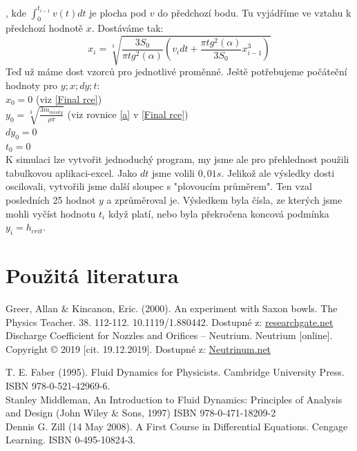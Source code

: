 \documentclass[14pt,a4paper]{article}
\begin{document}
, kde $\int_{0}^{t_{i-1}} v(t)dt$ je plocha pod $v$ do předchozí bodu. Tu vyjádříme ve vztahu k předchozí hodnotě $x$. Dostáváme tak:
\begin{equation}
x_i=\sqrt[3]{\frac{3S_0}{\pi tg^2(\alpha)} \left(v_idt+\frac{\pi tg^2(\alpha)}{3S_0}x_{i-1}^{3}\right)}
\end{equation}
Teď už máme dost vzorců pro jednotlivé proměnné.
Ještě potřebujeme počáteční hodnoty pro $y ; x; dy;t$:\\
$x_0=0$ (viz \ref{Final rce})\\
$y_0=\sqrt[3]{\frac{3m_{misky}}{\rho \pi}}$	(viz rovnice \ref{a} v \ref{Final rce})\\
$dy_0=0$\\
$t_0=0$\\
K simulaci lze vytvořit jednoduchý program, my jsme ale pro přehlednost použili tabulkovou aplikaci-excel. Jako $dt$ jsme volili $0,01s$. Jelikož ale výsledky dosti oscilovali, vytvořili jsme další sloupec s "plovoucím průměrem". Ten vzal posledních 25 hodnot $y$ a zprůměroval je. Výsledkem byla čísla, ze kterých jsme mohli vyčíst hodnotu $t_i$ když platí, nebo byla překročena koncová podmínka $y_i=h_{crit}$.
\newpage
\section{Použitá literatura}
\begin{thebibliography}{3}
Greer, Allan \& Kincanon, Eric. (2000). An experiment with Saxon bowls. The Physics Teacher. 38. 112-112. 10.1119/1.880442.  Dostupné z:
\href{https://www.researchgate.net/publication/239045627_An_experiment_with_Saxon_bowls}{ researchgate.net}
Discharge Coefficient for Nozzles and Orifices – Neutrium. Neutrium [online]. Copyright © 2019 [cit. 19.12.2019]. Dostupné z:
\href{https://neutrium.net/fluid_flow/discharge-coefficient-for-nozzles-and-orifices/}{Neutrinum.net}

T. E. Faber (1995). Fluid Dynamics for Physicists. Cambridge University Press. ISBN 978-0-521-42969-6.\\
Stanley Middleman, An Introduction to Fluid Dynamics: Principles of Analysis and Design (John Wiley \& Sons, 1997) ISBN 978-0-471-18209-2\\
Dennis G. Zill (14 May 2008). A First Course in Differential Equations. Cengage Learning. ISBN 0-495-10824-3.
\end{thebibliography}
\end{document}
